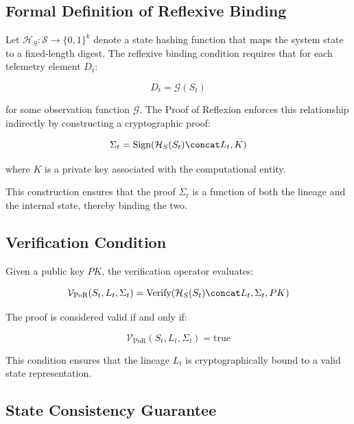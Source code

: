 \subsection{Formal Definition of Reflexive Binding}

Let $\mathcal{H}_S: \mathcal{S} \rightarrow \{0,1\}^k$ denote a state hashing function that maps the system state to a fixed-length digest. The reflexive binding condition requires that for each telemetry element $D_t$:

\begin{equation}
D_t = \mathcal{G}(S_t)
\end{equation}

for some observation function $\mathcal{G}$. The Proof of Reflexion enforces this relationship indirectly by constructing a cryptographic proof:

\begin{equation}
\Sigma_t = \text{Sign}(\mathcal{H}_S(S_t) \concat L_t, K)
\end{equation}

where $K$ is a private key associated with the computational entity.

This construction ensures that the proof $\Sigma_t$ is a function of both the lineage and the internal state, thereby binding the two.

\subsection{Verification Condition}

Given a public key $PK$, the verification operator evaluates:

\begin{equation}
\mathcal{V}_{\text{PoR}}(S_t, L_t, \Sigma_t) = \text{Verify}(\mathcal{H}_S(S_t) \concat L_t, \Sigma_t, PK)
\end{equation}

The proof is considered valid if and only if:

\begin{equation}
\mathcal{V}_{\text{PoR}}(S_t, L_t, \Sigma_t) = \text{true}
\end{equation}

This condition ensures that the lineage $L_t$ is cryptographically bound to a valid state representation.

\subsection{State Consistency Guarantee}

